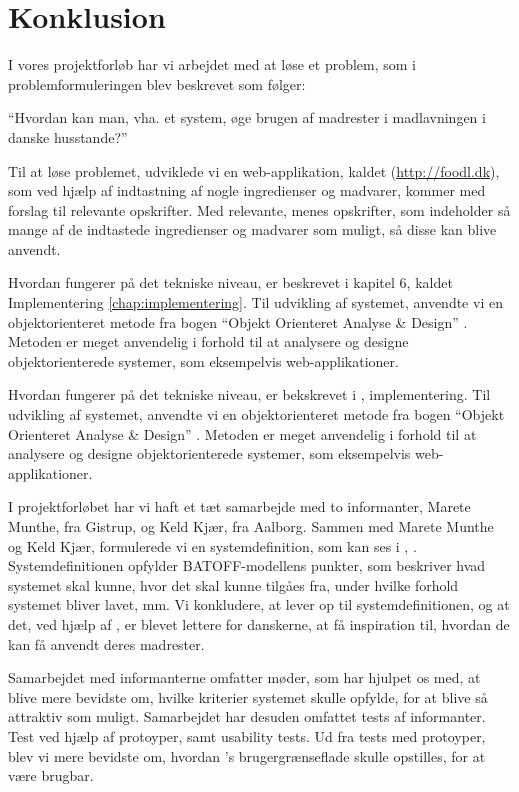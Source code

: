 \chapter{Konklusion}
\label{chap:konklusion}

I vores projektforløb har vi arbejdet med at løse et problem, som i problemformuleringen blev beskrevet som følger:

``Hvordan kan man, vha. et system, øge brugen af madrester i madlavningen i danske husstande?''

Til at løse problemet, udviklede vi en web-applikation, kaldet \Foodl{} (\url{http://foodl.dk}), som ved hjælp af indtastning af nogle ingredienser og madvarer, kommer med forslag til relevante opskrifter. Med relevante, menes opskrifter, som indeholder så mange af de indtastede ingredienser og madvarer som muligt, så disse kan blive anvendt.

Hvordan \Foodl{} fungerer på det tekniske niveau, er beskrevet i kapitel 6, kaldet Implementering \ref{chap:implementering}. Til udvikling af systemet, anvendte vi en objektorienteret metode fra bogen ``Objekt Orienteret Analyse \& Design'' \cite{ooad}. Metoden er meget anvendelig i forhold til at analysere og designe objektorienterede systemer, som eksempelvis web-applikationer. 

Hvordan \Foodl{} fungerer på det tekniske niveau, er bekskrevet i , implementering. Til udvikling af systemet, anvendte vi en objektorienteret metode fra bogen ``Objekt Orienteret Analyse \& Design'' \cite{ooad}. Metoden er meget anvendelig i forhold til at analysere og designe objektorienterede systemer, som eksempelvis web-applikationer. 

I projektforløbet har vi haft et tæt samarbejde med to informanter, Marete Munthe, fra Gistrup, og Keld Kjær, fra Aalborg. Sammen med Marete Munthe og Keld Kjær, formulerede vi en systemdefinition, som kan ses i , . Systemdefinitionen opfylder BATOFF-modellens punkter, som beskriver hvad systemet skal kunne, hvor det skal kunne tilgåes fra, under hvilke forhold systemet bliver lavet, mm. Vi konkludere, at \Foodl{} lever op til systemdefinitionen, og at det, ved hjælp af \Foodl{}, er blevet lettere for danskerne, at få inspiration til, hvordan de kan få anvendt deres madrester.

Samarbejdet med informanterne omfatter møder, som har hjulpet os med, at blive mere bevidste om, hvilke kriterier systemet skulle opfylde, for at blive så attraktiv som muligt. Samarbejdet har desuden omfattet tests af informanter. Test ved hjælp af protoyper, samt usability tests. Ud fra tests med protoyper, blev vi mere bevidste om, hvordan \Foodl{}'s brugergrænseflade skulle opstilles, for at være brugbar. 

